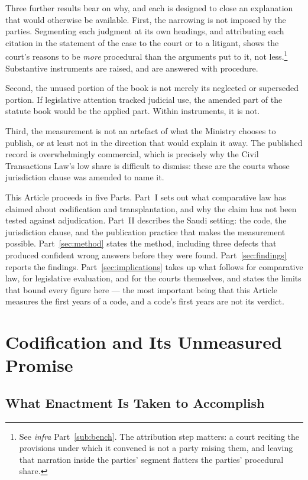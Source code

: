 \documentclass[12pt]{article}
\begin{document}
Three further results bear on why, and each is designed to close an
explanation that would otherwise be available. First, the narrowing is not
imposed by the parties. Segmenting each judgment at its own headings, and
attributing each citation in the statement of the case to the court or to a
litigant, shows the court's reasons to be \emph{more} procedural than the
arguments put to it, not less.\footnote{See \emph{infra} Part~\ref{sub:bench}. The
attribution step matters: a court reciting the provisions under which it
convened is not a party raising them, and leaving that narration inside the
parties' segment flatters the parties' procedural share.} Substantive
instruments are raised, and are answered with procedure.

Second, the unused portion of the book is not merely its neglected or
superseded portion. If legislative attention tracked judicial use, the amended
part of the statute book would be the applied part. Within instruments, it is
not.

Third, the measurement is not an artefact of what the Ministry chooses to
publish, or at least not in the direction that would explain it away. The
published record is overwhelmingly commercial, which is precisely why the
Civil Transactions Law's low share is difficult to dismiss: these are the
courts whose jurisdiction clause was amended to name it.

This Article proceeds in five Parts. Part~I sets out what comparative law has
claimed about codification and transplantation, and why the claim has not been
tested against adjudication. Part~II describes the Saudi setting: the code,
the jurisdiction clause, and the publication practice that makes the
measurement possible. Part~\ref{sec:method} states the method, including three defects that
produced confident wrong answers before they were found.
Part~\ref{sec:findings} reports the findings. Part~\ref{sec:implications} takes up what follows for comparative law, for legislative
evaluation, and for the courts themselves, and states the limits that bound
every figure here --- the most important being that this Article measures the
first years of a code, and a code's first years are not its verdict.

\section{Codification and Its Unmeasured Promise}
\label{sec:codification}

\subsection{What Enactment Is Taken to Accomplish}
\end{document}
